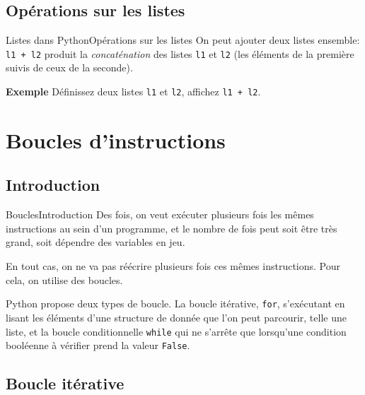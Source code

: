 \documentclass[10pt]{beamer}
\begin{document}
\subsection{Opérations sur les listes}

\begin{frame}[fragile]{Listes dans Python}{Opérations sur les listes}
	On peut ajouter deux listes ensemble: \lstinline|l1 + l2| produit la \textit{concaténation} des listes \lstinline|l1| et \lstinline|l2| (les éléments de la première suivis de ceux de la seconde).
	
	\begin{block}{\textbf{Exemple}}
		Définissez deux listes \lstinline|l1| et \lstinline|l2|, affichez \lstinline|l1 + l2|.
	\end{block}
\end{frame}

\section{Boucles d'instructions}
\subsection{Introduction}

\begin{frame}[fragile]{Boucles}{Introduction}
	Des fois, on veut exécuter plusieurs fois les mêmes instructions au sein d'un programme, et le nombre de fois peut soit être très grand, soit dépendre des variables en jeu.
	\pause
	
	En tout cas, on ne va pas réécrire plusieurs fois ces mêmes instructions. Pour cela, on utilise des boucles.
	\pause
	
	Python propose deux types de boucle. La boucle itérative, \lstinline|for|, s'exécutant en lisant les éléments d'une structure de donnée que l'on peut parcourir, telle une liste, et la boucle conditionnelle \lstinline|while| qui ne s'arrête que lorsqu'une condition booléenne à vérifier prend la valeur \lstinline|False|.
\end{frame}

\subsection{Boucle itérative}
\end{document}
